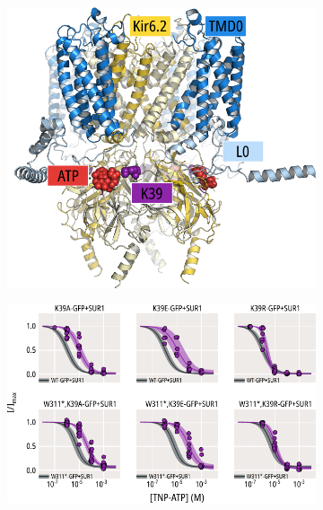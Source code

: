 \begin{figure}[h]
	\centering
	\begin{subfigure}[t]{0.45\textwidth}
		\caption{}\label{ch5fig:k39_loc}
		\centering
		\includegraphics[width=\textwidth]{k39_1.pdf}
	\end{subfigure}
	\hfill
	\begin{subfigure}[t]{0.45\textwidth}
		\caption{}\label{ch5fig:k39_tnpatp_popfits_1}
		\centering
		\includegraphics[width=\textwidth]{k39_3.pdf}
	\end{subfigure}
	\vfill
	\begin{subfigure}[t]{0.45\textwidth}
		\caption{}\label{ch5fig:k39_atp_popfits}

\end{subfigure}
\end{figure}
